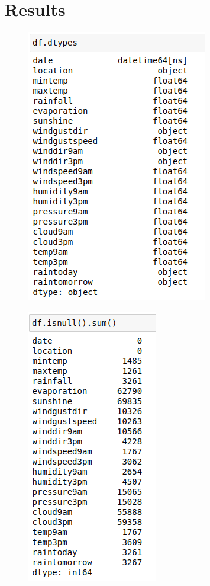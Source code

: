 \documentclass{beamer}
\begin{document}
\section{Results}
\begin{frame}[plain]
    \begin{figure}
        \includegraphics[width=.5\textwidth]{images/dtypes.png}
    \end{figure}
\end{frame}

\begin{frame}[plain]
    \begin{figure}
        \includegraphics[width=.4\textwidth]{images/null.png}
    \end{figure}
\end{frame}
\end{document}
